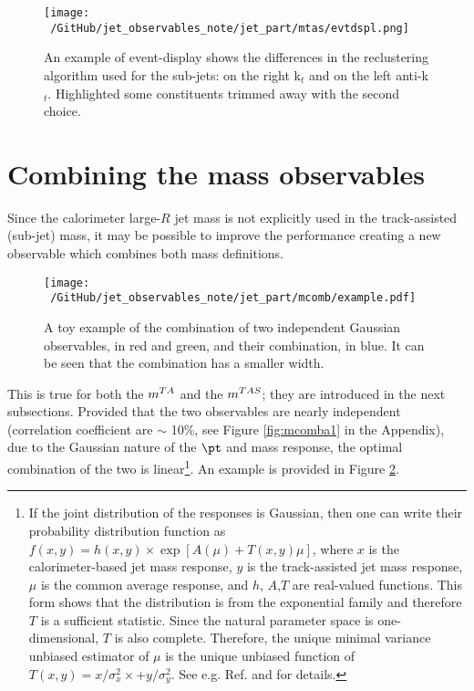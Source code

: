 \begin{figure}[!ht]
  \centering
      \texttt{[image: ~/GitHub/jet\_observables\_note/jet\_part/mtas/evtdspl.png]}
  \caption[Different reclustering in event display]{An example of event-display shows the differences in the reclustering algorithm used for the sub-jets: on the right  k$_t$ and on the left anti-k$_t$. Highlighted some constituents trimmed away with the second choice.}
  \label{fig:evtdspl}
\end{figure}

\section{Combining the mass observables}


Since the calorimeter large-$R$ jet mass is not explicitly used in the track-assisted (sub-jet) mass, it may be possible to improve the performance creating a new observable which combines both mass definitions.


\begin{figure}[!ht]
  \centering
      \texttt{[image: ~/GitHub/jet\_observables\_note/jet\_part/mcomb/example.pdf]}
  \caption[Toy example of Gaussian combination]{A toy example of the combination of two independent Gaussian observables, in red and green, and their combination, in blue. It can be seen that the combination has a smaller width.}
  \label{fig:mcomb1}
\end{figure}

This is true for both the $m^{TA}$ and the $m^{TAS}$; they are introduced in the next subsections.
Provided that the two observables are nearly independent (correlation coefficient are $\sim$ 10\%, see Figure \ref{fig:mcomba1} in the Appendix), due to the Gaussian nature of the $\pt$ and mass response, the optimal combination of the two is linear\footnote{If the joint distribution of the responses is Gaussian, then one can write their probability distribution function as $f(x,y)=h(x,y)\times \exp[A(\mu)+T(x,y)\mu]$, where $x$ is the calorimeter-based jet mass response, $y$ is the track-assisted jet mass response,
$\mu$ is the common average response, and $h$, $A$,$T$ are real-valued functions. This form shows that the distribution is from the exponential family and therefore $T$ is a sufficient statistic. Since the natural parameter space is one-dimensional, $T$ is also complete. Therefore, the unique minimal variance unbiased estimator of $\mu$ is the unique unbiased function of $T(x, y) =x/\sigma^2_x \times + y/\sigma^2_y$.
See e.g. Ref. \cite{statistic} and \cite{art35} for details.}.
An example is provided in Figure \ref{fig:mcomb1}.
